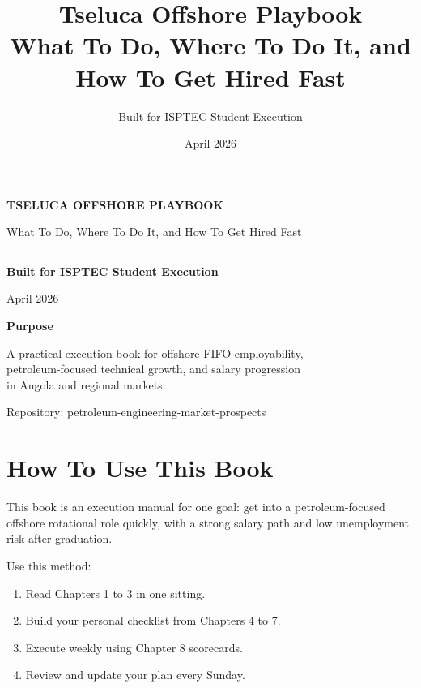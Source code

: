 \documentclass[11pt,openany]{book}
\title{Tseluca Offshore Playbook\\\large What To Do, Where To Do It, and How To Get Hired Fast}
\author{Built for ISPTEC Student Execution}
\date{April 2026}
\begin{document}
\frontmatter
\begin{titlepage}
\thispagestyle{empty}
\colorbox{Soft}{
  \parbox{\dimexpr\textwidth-2\fboxsep\relax}{
    \vspace{1.1cm}
    {\sffamily\bfseries\LARGE\color{DeepSea}TSELUCA OFFSHORE PLAYBOOK\par}
    \vspace{0.35cm}
    {\sffamily\large\color{Ink}What To Do, Where To Do It, and How To Get Hired Fast\par}
    \vspace{0.75cm}
    {\sffamily\color{Accent}\rule{0.32\textwidth}{1.4pt}\par}
    \vspace{0.85cm}
    {\large\bfseries Built for ISPTEC Student Execution\par}
    \vspace{0.3cm}
    {April 2026\par}
    \vspace{1.0cm}
    \textbf{Purpose}\par
    A practical execution book for offshore FIFO employability,\\
    petroleum-focused technical growth, and salary progression\\
    in Angola and regional markets.
    \vspace{1.2cm}
  }
}
\vfill
{\small\color{Ink}Repository: petroleum-engineering-market-prospects}
\end{titlepage}

\chapter*{How To Use This Book}
This book is an execution manual for one goal: get into a petroleum-focused offshore rotational role quickly, with a strong salary path and low unemployment risk after graduation.

Use this method:
\begin{enumerate}
  \item Read Chapters 1 to 3 in one sitting.
  \item Build your personal checklist from Chapters 4 to 7.
  \item Execute weekly using Chapter 8 scorecards.
  \item Review and update your plan every Sunday.
\end{enumerate}

\tableofcontents

\mainmatter
\end{document}
